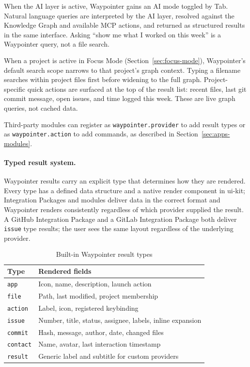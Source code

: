 When the AI layer is active, Waypointer gains an AI mode toggled by Tab.
Natural language queries are interpreted by the AI layer, resolved against the
Knowledge Graph and available MCP actions, and returned as structured results
in the same interface. Asking ``show me what I worked on this week'' is a
Waypointer query, not a file search.

When a project is active in Focus Mode (Section~\ref{sec:focus-mode}),
Waypointer's default search scope narrows to that project's graph context.
Typing a filename searches within project files first before widening to the
full graph. Project-specific quick actions are surfaced at the top of the
result list: recent files, last git commit message, open issues, and time
logged this week. These are live graph queries, not cached data.

Third-party modules can register as \texttt{waypointer.provider} to add result
types or as \texttt{waypointer.action} to add commands, as described in
Section~\ref{sec:apps-modules}.

\paragraph{Typed result system.}
Waypointer results carry an explicit type that determines how they are
rendered. Every type has a defined data structure and a native render component
in ui-kit; Integration Packages and modules deliver data in the correct format
and Waypointer renders consistently regardless of which provider supplied the
result. A GitHub Integration Package and a GitLab Integration Package both
deliver \texttt{issue} type results; the user sees the same layout
regardless of the underlying provider.

\begin{table}[htbp]
\caption{Built-in Waypointer result types}
\label{tab:waypointer-types}
\begin{tabularx}{\linewidth}{lX}
\toprule
\textbf{Type} & \textbf{Rendered fields} \\
\midrule
\texttt{app}     & Icon, name, description, launch action \\
\texttt{file}    & Path, last modified, project membership \\
\texttt{action}  & Label, icon, registered keybinding \\
\texttt{issue}   & Number, title, status, assignee, labels, inline expansion \\
\texttt{commit}  & Hash, message, author, date, changed files \\
\texttt{contact} & Name, avatar, last interaction timestamp \\
\texttt{result}  & Generic label and subtitle for custom providers \\
\bottomrule
\end{tabularx}
\end{table}

